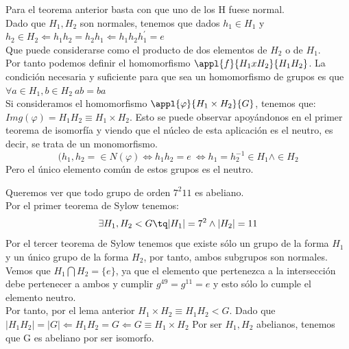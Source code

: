 \documentclass[nochap]{apuntes}
\begin{document}
 Para el teorema anterior basta con que uno de los H fuese normal.\\
 Dado que $H_1, H_2$ son normales, tenemos que dados $h_1\in H_1$  y $h_2\in H_2 \Leftarrow h_1h_2=h_2h_1 \Leftarrow h_1h_2h_1^{'}=e$\\
 Que puede considerarse como el producto de dos elementos de $H_2$  o de $H_1$.\\
 Por tanto podemos definir el homomorfismo $\appl{f}{H_1xH_2}{H_1H_2}$. La condición necesaria y suficiente para que sea un homomorfismo
 de grupos es que $\forall a \in H_1, b \in H_2 \ ab=ba$\\
 Si consideramos el homomorfismo $\appl{\varphi}{H_1\times H_2}{G}$, tenemos que:\\
 $Img(\varphi)=H_1H_2\equiv H_1 \times H_2$. Esto se puede observar apoyándonos en el primer teorema de isomorfía y viendo que el 
 núcleo de esta aplicación es el neutro, es decir, se trata de un monomorfismo.\\
 \[(h_1,h_2=\in N(\varphi) \Leftrightarrow h_1h_2=e \ \Leftrightarrow h_1=h_2^{-1}\in H_1 \wedge \in H_2\]
 Pero el único elemento común de estos grupos es el neutro.\\
 
 \begin{example}
  Queremos ver que todo grupo de orden $7^{2}11$  es abeliano.\\
  Por el primer teorema de Sylow tenemos: \\
  \[\exists H_1, H_2 <G \tq |H_1|=7^{2} \wedge |H_2|=11\]
  Por el tercer teorema de Sylow tenemos que existe sólo un grupo de la forma $H_1$  y un único grupo de la forma $H_2$, por tanto,
  ambos subgrupos son normales.\\
  Vemos que $H_1 \bigcap H_2 = \{e\}$, ya que el elemento que pertenezca a la intersección debe pertenecer a ambos y cumplir $g^49=g^11=e$  
  y esto sólo lo cumple el elemento neutro.\\
  Por tanto, por el lema anterior $H_1\times H_2 \equiv H_1H_2 < G$. Dado que $|H_1H_2|=|G| \Leftarrow H_1H_2=G \Leftarrow G \equiv H_1 \times H_2$
  Por ser $H_1, H_2$  abelianos, tenemos que G es abeliano por ser isomorfo.
  \end{example}
\end{document}
